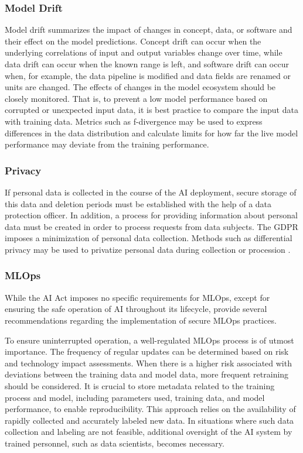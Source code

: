 \subsubsection{Model Drift}
Model drift summarizes the impact of changes in concept, data, or software and their effect on the model predictions. Concept drift can occur when the underlying correlations of input and output variables change over time, while data drift can occur when the known range is left, and software drift can occur when, for example, the data pipeline is modified and data fields are renamed or units are changed. The effects of changes in the model ecosystem should be closely monitored. That is, to prevent a low model performance based on corrupted or unexpected input data, it is best practice to compare the input data with training data. Metrics such as f-divergence may be used to express differences in the data distribution and calculate limits for how far the live model performance may deviate from the training performance.

\subsubsection{Privacy}
If personal data is collected in the course of the AI deployment, secure storage of this data and deletion periods must be established with the help of a data protection officer. In addition, a process for providing information about personal data must be created in order to process requests from data subjects. The \ac{GDPR} imposes a minimization of personal data collection. Methods such as differential privacy may be used to privatize personal data during collection or procession  \citep{dwork2014algorithmic}.

\subsubsection{MLOps}
While the AI Act imposes no specific requirements for MLOps, except for ensuring the safe operation of AI throughout its lifecycle,  \cite{poretschkin2021_IAIS_Leitfaden} provide several recommendations regarding the implementation of secure MLOps practices.

To ensure uninterrupted operation, a well-regulated MLOps process is of utmost importance. The frequency of regular updates can be determined based on risk and technology impact assessments. When there is a higher risk associated with deviations between the training data and model data, more frequent retraining should be considered. It is crucial to store metadata related to the training process and model, including parameters used, training data, and model performance, to enable reproducibility. This approach relies on the availability of rapidly collected and accurately labeled new data. In situations where such data collection and labeling are not feasible, additional oversight of the AI system by trained personnel, such as data scientists, becomes necessary.

